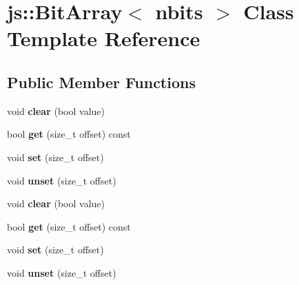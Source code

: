 \hypertarget{classjs_1_1_bit_array}{\section{js\-:\-:Bit\-Array$<$ nbits $>$ Class Template Reference}
\label{classjs_1_1_bit_array}
}
\subsection*{Public Member Functions}
\begin{DoxyCompactItemize}
\item 
\hypertarget{classjs_1_1_bit_array_a6cac8876a463806ed74315d2c523b228}{void {\bfseries clear} (bool value)}\label{classjs_1_1_bit_array_a6cac8876a463806ed74315d2c523b228}

\item 
\hypertarget{classjs_1_1_bit_array_a4f71f8de0365dfe017e6fa70a61b3b96}{bool {\bfseries get} (size\-\_\-t offset) const }\label{classjs_1_1_bit_array_a4f71f8de0365dfe017e6fa70a61b3b96}

\item 
\hypertarget{classjs_1_1_bit_array_ad0d3a03db57d8152319533982f77a7f5}{void {\bfseries set} (size\-\_\-t offset)}\label{classjs_1_1_bit_array_ad0d3a03db57d8152319533982f77a7f5}

\item 
\hypertarget{classjs_1_1_bit_array_aaed502c817ab49943ed5fc8675099722}{void {\bfseries unset} (size\-\_\-t offset)}\label{classjs_1_1_bit_array_aaed502c817ab49943ed5fc8675099722}

\item 
\hypertarget{classjs_1_1_bit_array_a6cac8876a463806ed74315d2c523b228}{void {\bfseries clear} (bool value)}\label{classjs_1_1_bit_array_a6cac8876a463806ed74315d2c523b228}

\item 
\hypertarget{classjs_1_1_bit_array_a4f71f8de0365dfe017e6fa70a61b3b96}{bool {\bfseries get} (size\-\_\-t offset) const }\label{classjs_1_1_bit_array_a4f71f8de0365dfe017e6fa70a61b3b96}

\item 
\hypertarget{classjs_1_1_bit_array_ad0d3a03db57d8152319533982f77a7f5}{void {\bfseries set} (size\-\_\-t offset)}\label{classjs_1_1_bit_array_ad0d3a03db57d8152319533982f77a7f5}

\item 
\hypertarget{classjs_1_1_bit_array_aaed502c817ab49943ed5fc8675099722}{void {\bfseries unset} (size\-\_\-t offset)}\label{classjs_1_1_bit_array_aaed502c817ab49943ed5fc8675099722}

\end{DoxyCompactItemize}
